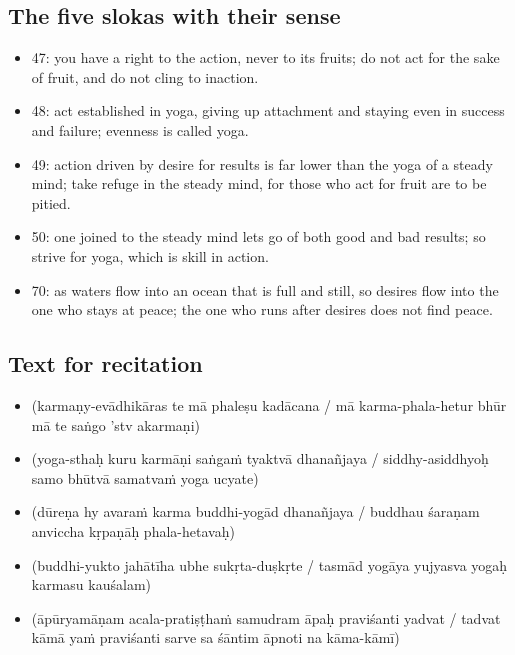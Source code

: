 \subsection*{The five slokas with their sense}
\begin{itemize}
\item 47: you have a right to the action, never to its fruits; do not act for the sake of fruit, and do not cling to inaction.
\item 48: act established in yoga, giving up attachment and staying even in success and failure; evenness is called yoga.
\item 49: action driven by desire for results is far lower than the yoga of a steady mind; take refuge in the steady mind, for those who act for fruit are to be pitied.
\item 50: one joined to the steady mind lets go of both good and bad results; so strive for yoga, which is skill in action.
\item 70: as waters flow into an ocean that is full and still, so desires flow into the one who stays at peace; the one who runs after desires does not find peace.
\end{itemize}

\subsection*{Text for recitation}
\begin{itemize}
\item[2.47]  (karmaṇy-evādhikāras te mā phaleṣu kadācana / mā karma-phala-hetur bhūr mā te saṅgo 'stv akarmaṇi)
\item[2.48]  (yoga-sthaḥ kuru karmāṇi saṅgaṁ tyaktvā dhanañjaya / siddhy-asiddhyoḥ samo bhūtvā samatvaṁ yoga ucyate)
\item[2.49]  (dūreṇa hy avaraṁ karma buddhi-yogād dhanañjaya / buddhau śaraṇam anviccha kṛpaṇāḥ phala-hetavaḥ)
\item[2.50]  (buddhi-yukto jahātīha ubhe sukṛta-duṣkṛte / tasmād yogāya yujyasva yogaḥ karmasu kauśalam)
\item[2.70]  (āpūryamāṇam acala-pratiṣṭhaṁ samudram āpaḥ praviśanti yadvat / tadvat kāmā yaṁ praviśanti sarve sa śāntim āpnoti na kāma-kāmī)
\end{itemize}

